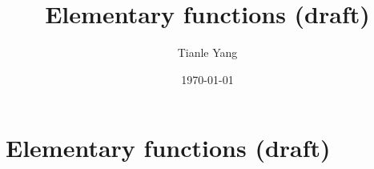\documentclass{noteformyself}
\title{Elementary functions (draft)}
\author{Tianle Yang}
\date{\today}
\begin{document}
    \maketitle

    \section{Elementary functions (draft)}


    

\end{document}
